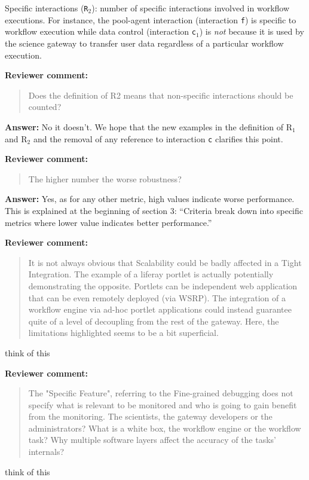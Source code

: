 \documentclass[a4]{article}
\newenvironment{review}%
{\textbf{Reviewer comment:}\begin{quote}}%
{\end{quote}}%
\newcommand{\answer}[1]{\textbf{Answer:} #1}
\newcommand{\todo}[1]{\color{red}#1\color{black}}
\newcommand{\revised}[1]{\color{blue} #1\color{black}}
\begin{document}
Specific interactions (\texttt{R$_2$}): number of specific
  interactions involved in workflow executions. \revised{For
    instance, the pool-agent interaction (interaction \texttt{f}) is
    specific to workflow execution while data control (interaction
    \texttt{c$_1$}) is \emph{not} because it is used by the science gateway to transfer
    user data regardless of a particular workflow execution}.

\begin{review}
Does the definition of R2 means that non-specific
  interactions should be counted?
\end{review}

\answer{No it doesn't. We hope that the new examples in the definition of
R$_1$ and R$_2$ and the removal of any reference to interaction
\texttt{c} clarifies this point.}

\begin{review}
The higher number the worse
  robustness?
\end{review}

\answer{Yes, as for any other metric, high values indicate worse
performance. This is explained at the beginning of section 3:
``Criteria break down into specific metrics where lower value
indicates better performance.''}

\begin{review}
It is not always obvious that Scalability could be badly affected in a Tight Integration. The example of a liferay portlet is actually potentially demonstrating the opposite. Portlets can be independent web application that can be even remotely deployed (via WSRP). The integration of a workflow engine via ad-hoc portlet applications could instead guarantee quite of a level of decoupling from the rest of the gateway. Here, the limitations highlighted seems to be a bit superficial.
\end{review}

\todo{think of this}

\begin{review}
The "Specific Feature", referring to the Fine-grained debugging does not specify what is relevant to be monitored and who is going to gain benefit from the monitoring. The scientists, the gateway developers or the administrators? What is a white box, the workflow engine or the workflow task? Why multiple software layers affect the accuracy of the tasks' internals?
\end{review}

\todo{think of this}
\end{document}
